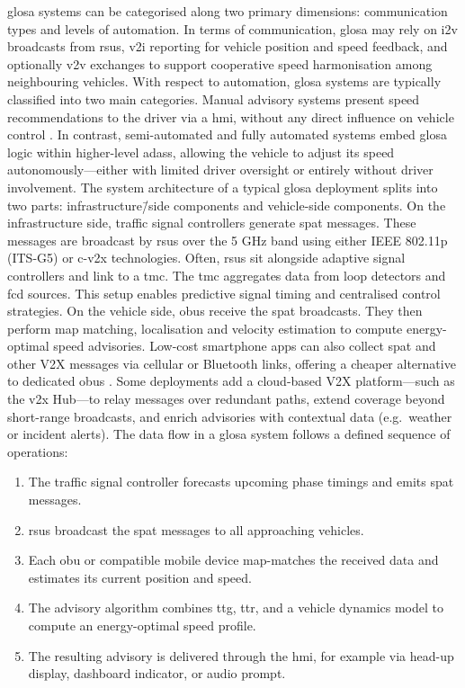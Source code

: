\ac{glosa} systems can be categorised along two primary dimensions: communication types and levels of automation. In terms of communication, \ac{glosa} may rely on \ac{i2v} broadcasts from \acp{rsu}, \ac{v2i} reporting for vehicle position and speed feedback, and optionally \ac{v2v} exchanges to support cooperative speed harmonisation among neighbouring vehicles. \cite{Seredynski2013} With respect to automation, \ac{glosa} systems are typically classified into two main categories. Manual advisory systems present speed recommendations to the driver via a \ac{hmi}, without any direct influence on vehicle control \cite{BusesGLOSA2022}. In contrast, semi-automated and fully automated systems embed \ac{glosa} logic within higher-level \acp{adas}, allowing the vehicle to adjust its speed autonomously—either with limited driver oversight or entirely without driver involvement. \cite{Almannaa2019}
\mynewline
The system architecture of a typical \ac{glosa} deployment splits into two parts: infrastructure\=/side components and vehicle-side components. On the infrastructure side, traffic signal controllers generate \ac{spat} messages. These messages are broadcast by \acp{rsu} over the 5 GHz band using either IEEE 802.11p (ITS-G5) or \ac{c-v2x} technologies. Often, \acp{rsu} sit alongside adaptive signal controllers and link to a \ac{tmc}. The \ac{tmc} aggregates data from loop detectors and \ac{fcd} sources. This setup enables predictive signal timing and centralised control strategies.
On the vehicle side, \acp{obu} receive the \ac{spat} broadcasts. They then perform map matching, localisation and velocity estimation to compute energy-optimal speed advisories. \cite{Sambeek2015} Low-cost smartphone apps can also collect \ac{spat} and other V2X messages via cellular or Bluetooth links, offering a cheaper alternative to dedicated \acp{obu} \cite{Gao2016}. Some deployments add a cloud-based V2X platform—such as the \ac{v2x} Hub—to relay messages over redundant paths, extend coverage beyond short-range broadcasts, and enrich advisories with contextual data (e.g.\ weather or incident alerts). \cite{Hadi2023}
\mynewline
The data flow in a \ac{glosa} system follows a defined sequence of operations:

\begin{enumerate}[leftmargin=*, label=\textbf{Step \arabic*:}]
  \item The traffic signal controller forecasts upcoming phase timings and emits \ac{spat} messages.
  \item \acp{rsu} broadcast the \ac{spat} messages to all approaching vehicles.
  \item Each \ac{obu} or compatible mobile device map-matches the received data and estimates its current position and speed.
  \item The advisory algorithm combines \ac{ttg}, \ac{ttr}, and a vehicle dynamics model to compute an energy-optimal speed profile.
  \item The resulting advisory is delivered through the \ac{hmi}, for example via head-up display, dashboard indicator, or audio prompt.
\end{enumerate}

